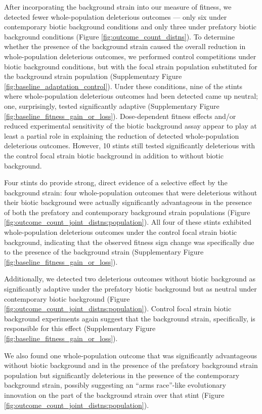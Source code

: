 

After incorporating the background strain into our measure of fitness, we detected fewer whole-population deleterious outcomes --- only six under contemporary biotic background conditions and only three under prefatory biotic background conditions (Figure \ref{fig:outcome_count_distns}).
To determine whether the presence of the background strain caused the overall reduction in whole-population deleterious outcomes, we performed control competitions under biotic background conditions, but with the focal strain population substituted for the background strain population (Supplementary Figure \ref{fig:baseline_adaptation_control}).
Under these conditions, nine of the stints where whole-population deleterious outcomes had been detected came up neutral;
one, surprisingly, tested significantly adaptive (Supplementary Figure \ref{fig:baseline_fitness_gain_or_loss}).
Dose-dependent fitness effects and/or reduced experimental sensitivity of the biotic background assay appear to play at least a partial role in explaining the reduction of detected whole-population deleterious outcomes.
However, 10 stints still tested significantly deleterious with the control focal strain biotic background in addition to without biotic background.

Four stints do provide strong, direct evidence of a selective effect by the background strain: four whole-population outcomes that were deleterious without their biotic background were actually significantly advantageous in the presence of both the prefatory and contemporary background strain populations (Figure \ref{fig:outcome_count_joint_distns:population}).
All four of these stints exhibited whole-population deleterious outcomes under the control focal strain biotic background, indicating that the observed fitness sign change was specifically due to the presence of the background strain (Supplementary Figure \ref{fig:baseline_fitness_gain_or_loss}).

Additionally, we detected two deleterious outcomes without biotic background as significantly adaptive under the prefatory biotic background but as neutral under contemporary biotic background (Figure \ref{fig:outcome_count_joint_distns:population}).
Control focal strain biotic background experiments again suggest that the background strain, specifically, is responsible for this effect (Supplementary Figure \ref{fig:baseline_fitness_gain_or_loss}).

We also found one whole-population outcome that was significantly advantageous without biotic background and in the presence of the prefatory background strain population but significantly deleterious in the presence of the contemporary background strain, possibly suggesting an ``arms race''-like evolutionary innovation on the part of the background strain over that stint (Figure \ref{fig:outcome_count_joint_distns:population}).

